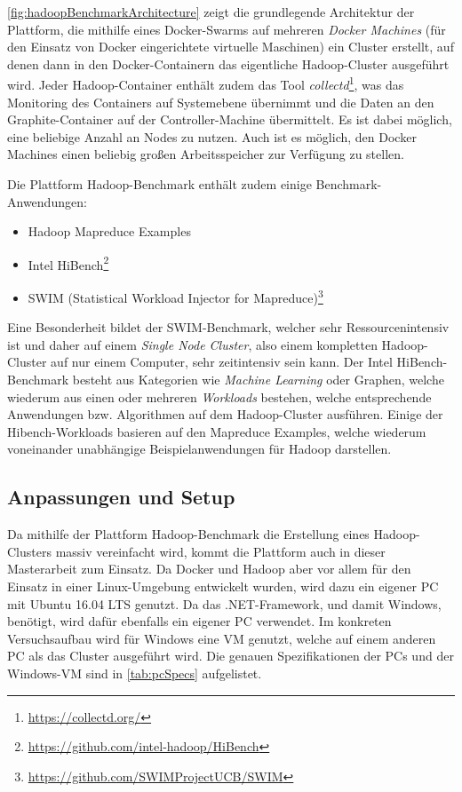 \autoref{fig:hadoopBenchmarkArchitecture} zeigt die grundlegende Architektur der Plattform, die mithilfe eines Docker-Swarms auf mehreren \emph{Docker Machines} (für den Einsatz von Docker eingerichtete virtuelle Maschinen) ein Cluster erstellt, auf denen dann in den Docker-Containern das eigentliche Hadoop-Cluster ausgeführt wird. Jeder Hadoop-Container enthält zudem das Tool \emph{collectd}\footnote{\url{https://collectd.org/}}, was das Monitoring des Containers auf Systemebene übernimmt und die Daten an den Graphite-Container auf der Controller-Machine übermittelt. Es ist dabei möglich, eine beliebige Anzahl an Nodes zu nutzen. Auch ist es möglich, den Docker Machines einen beliebig großen Arbeitsspeicher zur Verfügung zu stellen.

Die Plattform Hadoop-Benchmark enthält zudem einige Benchmark-Anwendungen:

\begin{itemize}[noitemsep]
    \item Hadoop Mapreduce Examples
    \item Intel HiBench\footnote{\url{https://github.com/intel-hadoop/HiBench}}
    \item SWIM (Statistical Workload Injector for Mapreduce)\footnote{\url{https://github.com/SWIMProjectUCB/SWIM}}
\end{itemize}

Eine Besonderheit bildet der SWIM-Benchmark, welcher sehr Ressourcenintensiv ist und daher auf einem \emph{Single Node Cluster}, also einem kompletten Hadoop-Cluster auf nur einem Computer, sehr zeitintensiv sein kann. Der Intel HiBench-Benchmark besteht aus Kategorien wie \emph{Machine Learning} oder Graphen, welche wiederum aus einen oder mehreren \emph{Workloads} bestehen, welche entsprechende Anwendungen bzw. Algorithmen auf dem Hadoop-Cluster ausführen. Einige der Hibench-Workloads basieren auf den Mapreduce Examples, welche wiederum voneinander unabhängige Beispielanwendungen für Hadoop darstellen.

\subsection{Anpassungen und Setup}\label{sec:clusterFallstudie}

Da mithilfe der Plattform Hadoop-Benchmark die Erstellung eines Hadoop-Clusters massiv vereinfacht wird, kommt die Plattform auch in dieser Masterarbeit zum Einsatz. Da Docker und Hadoop aber vor allem für den Einsatz in einer Linux-Umgebung entwickelt wurden, wird dazu ein eigener PC mit Ubuntu 16.04 LTS genutzt. Da \sS das .NET-Framework, und damit Windows, benötigt, wird dafür ebenfalls ein eigener PC verwendet. Im konkreten Versuchsaufbau wird für Windows eine VM genutzt, welche auf einem anderen PC als das Cluster ausgeführt wird. Die genauen Spezifikationen der PCs und der Windows-VM sind in \autoref{tab:pcSpecs} aufgelistet.

